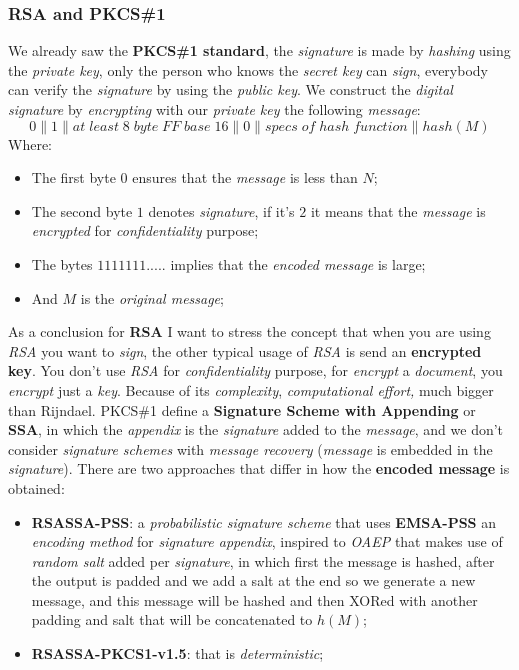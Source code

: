 \documentclass{article}
\begin{document}
\subsubsection{RSA and PKCS\#1}
We already saw the \textbf{PKCS\#1 standard}, the \emph{signature} is made by \emph{hashing} using the \emph{private key}, only the person who knows the \emph{secret key} can \emph{sign}, everybody can verify the \emph{signature} by using the \emph{public key}. We construct the \emph{digital signature} by \emph{encrypting} with our \emph{private key} the following \emph{message}:
\[ 0 \parallel 1 \parallel at\; least\; 8\; byte\; FF\; base\; 16 \parallel 0 \parallel specs\; of\; hash\; function \parallel hash(M)\]
Where:
\begin{itemize}
\item The first byte $0$ ensures that the \emph{message} is less than $N$;
\item The second byte $1$ denotes \emph{signature}, if it's $2$ it means that the \emph{message} is \emph{encrypted} for \emph{confidentiality} purpose;
\item The bytes $1111111.....$ implies that the \emph{encoded message} is large;
\item And $M$ is the \emph{original message};
\end{itemize}
As a conclusion for \textbf{RSA} I want to stress the concept that when you are using \emph{RSA} you want to \emph{sign}, the other typical usage of \emph{RSA} is send an \textbf{encrypted key}. You don’t use \emph{RSA} for \emph{confidentiality} purpose, for \emph{encrypt} a \emph{document}, you \emph{encrypt} just a \emph{key}. Because of its \emph{complexity}, \emph{computational effort,} much bigger than Rijndael. PKCS\#1 define a \textbf{Signature Scheme with Appending} or \textbf{SSA}, in which the \emph{appendix} is the \emph{signature} added to the \emph{message}, and we don't consider \emph{signature schemes} with \emph{message recovery} (\emph{message} is embedded in the \emph{signature}). There are two approaches that differ in how the \textbf{encoded message} is obtained:
\begin{itemize}
\item \textbf{RSASSA-PSS}: a \emph{probabilistic signature scheme} that uses \textbf{EMSA-PSS} an \emph{encoding method} for \emph{signature appendix}, inspired to \emph{OAEP} that makes use of \emph{random salt} added per \emph{signature}, in which first the message is hashed, after the output is padded and we add a salt at the end so we generate a new message, and this message will be hashed and then XORed with another padding and salt that will be concatenated to $h(M)$;
\item \textbf{RSASSA-PKCS1-v1.5}: that is \emph{deterministic};
\end{itemize}
\end{document}
